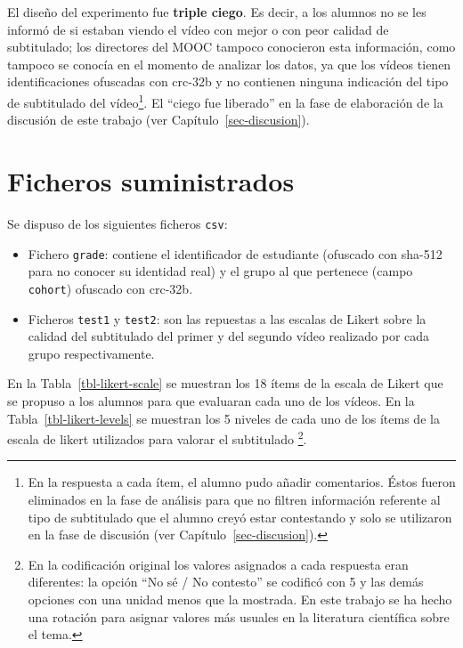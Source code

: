 \documentclass[
  12pt,
  a4paper,
  extrafontsizes,
  onecolumn,
  openright,
  table]{memoir}
\providecommand{\tightlist}{%
  \setlength{\itemsep}{0pt}\setlength{\parskip}{0pt}}\usepackage{longtable,booktabs,array}
\begin{document}
El diseño del experimento fue \textbf{\gls{triple ciego}}. Es decir, a
los alumnos no se les informó de si estaban viendo el vídeo con mejor o
con peor calidad de subtitulado; los directores del MOOC tampoco
conocieron esta información, como tampoco se conocía en el momento de
analizar los datos, ya que los vídeos tienen identificaciones ofuscadas
con \gls{crc}-32b y no contienen ninguna indicación del tipo de
subtitulado del vídeo\footnote{En la respuesta a cada ítem, el alumno
  pudo añadir comentarios. Éstos fueron eliminados en la fase de
  análisis para que no filtren información referente al tipo de
  subtitulado que el alumno creyó estar contestando y solo se utilizaron
  en la fase de discusión (ver Capítulo~\ref{sec-discusion}).}. El
\enquote{ciego fue liberado} en la fase de elaboración de la discusión
de este trabajo (ver Capítulo~\ref{sec-discusion}).

\clearpage

\hypertarget{ficheros-suministrados}{%
\section{Ficheros suministrados}\label{ficheros-suministrados}}

Se dispuso de los siguientes ficheros \texttt{csv}:

\begin{itemize}
\tightlist
\item
  Fichero \texttt{grade}: contiene el identificador de estudiante
  (ofuscado con \gls{sha}-512 para no conocer su identidad real) y el
  grupo al que pertenece (campo \texttt{cohort}) ofuscado con
  \gls{crc}-32b.
\item
  Ficheros \texttt{test1} y \texttt{test2}: son las repuestas a las
  escalas de Likert sobre la calidad del subtitulado del primer y del
  segundo vídeo realizado por cada grupo respectivamente.
\end{itemize}

En la Tabla~\ref{tbl-likert-scale} se muestran los 18 ítems de la escala
de Likert que se propuso a los alumnos para que evaluaran cada uno de
los vídeos. En la Tabla~\ref{tbl-likert-levels} se muestran los 5
niveles de cada uno de los ítems de la \gls{escala de likert} utilizados
para valorar el subtitulado \footnote{En la codificación original los
  valores asignados a cada respuesta eran diferentes: la opción
  \enquote{No sé / No contesto} se codificó con 5 y las demás opciones
  con una unidad menos que la mostrada. En este trabajo se ha hecho una
  rotación para asignar valores más usuales en la literatura científica
  sobre el tema.}.
\end{document}
